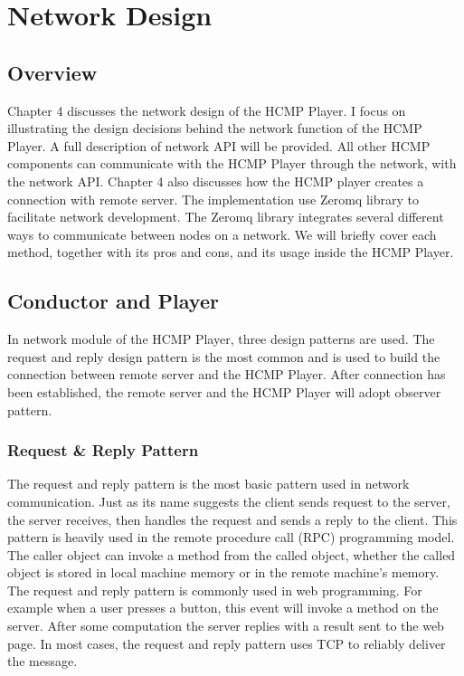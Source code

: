 
\chapter{Network Design}

\section{Overview}

Chapter 4 discusses the network design of the HCMP Player.  
I focus on illustrating the design decisions behind the network function of    
the HCMP Player. A full description of network API will be provided. All other
HCMP components can communicate with the HCMP Player through the network,
with the network API. Chapter 4 also discusses how the HCMP player 
creates a connection with remote server. The implementation 
use Zeromq \cite{zeromq} library to facilitate network development. The Zeromq library 
integrates several different ways to communicate between nodes on a network.
We will briefly cover each method, together with its pros and cons, and 
its usage inside the HCMP Player.

\section{Conductor and Player}
In network module of the HCMP Player, three design patterns are used. The 
request and reply design pattern is the most common and is used to 
build the connection between remote server and the HCMP Player. 
After connection has been established, the remote server and
the HCMP Player will adopt observer pattern. 

\subsection{Request \& Reply Pattern}
The request and reply pattern is the most basic pattern used in network 
communication. Just as its name suggests the client sends request to the server,
the server receives, then handles the request and sends a reply to
the client. This pattern is heavily used in the remote procedure call (RPC) 
programming model. The caller object can invoke a method from the called 
object, whether the called object is stored in local machine memory or
in the remote machine's memory. The request and reply pattern is commonly used
in web programming. For example when a user presses a button, this event will 
invoke a method on the server. After some computation the server replies with 
a result sent to the web page. In most cases, the request and reply pattern
uses TCP to reliably deliver the message. 

